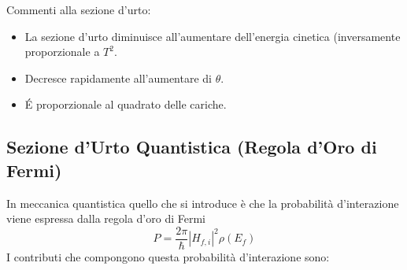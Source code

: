 Commenti alla sezione d'urto:
\begin{itemize}
\item La sezione d'urto diminuisce all'aumentare dell'energia cinetica (inversamente proporzionale a $T^2$.
\item Decresce rapidamente all'aumentare di $\theta$.
\item \'E proporzionale al quadrato delle cariche.
\end{itemize}


\subsection{Sezione d'Urto Quantistica (Regola d'Oro di Fermi)}
In meccanica quantistica quello che si introduce è che la probabilità d'interazione viene espressa dalla regola d'oro di Fermi
\begin{equation}
P=\frac{2\pi}{\hbar}|H_{f,i}|^2\rho(E_f)
\end{equation}
I contributi che compongono questa probabilità d'interazione sono:
